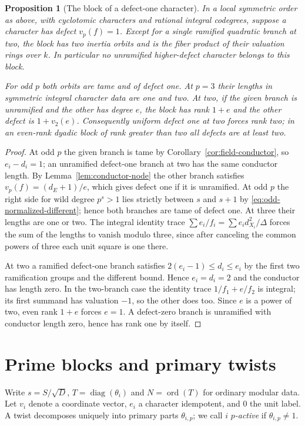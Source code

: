 \documentclass[11pt,a4paper]{article}
\numberwithin{equation}{section}
\newtheorem{proposition}[theorem]{Proposition}
\theoremstyle{remark}
\DeclareMathOperator{\ord}{ord}
\begin{document}
\begin{proposition}[The block of a defect-one character]\label{fam:M:2.10}
\label{seq:odd-defect-one}\label{lem:class}\label{prop:principal-defect-one-general}\label{lem:one-defect-block}\label{lem:two-adic-defect-one-rank}\label{lem:even-rank-defect-one}
In a local symmetric order as above, with cyclotomic characters and
rational integral codegrees, suppose a character has defect
$v_p(f)=1$. Except for a single ramified quadratic branch at two, the
block has two inertia orbits and is the fiber product of their valuation
rings over $k$. In particular no unramified higher-defect character
belongs to this block.

For odd $p$ both orbits are tame and of defect one. At $p=3$ their
lengths in symmetric integral character data are one and two.
At two, if the given branch is unramified and the other has degree
$e$, the block has rank $1+e$ and the other defect is $1+v_2(e)$.
Consequently uniform defect one at two forces rank two; in an
even-rank dyadic block of rank greater than two all defects are at
least two.
\end{proposition}
\begin{proof}
At odd $p$ the given branch is tame by
Corollary~\ref{cor:field-conductor}, so $e_i-d_i=1$; an unramified
defect-one branch at two has the same conductor length. By
Lemma~\ref{lem:conductor-node} the other branch satisfies
$v_p(f)=(d_E+1)/e$, which gives defect one if it is unramified.
At odd $p$ the right side for wild degree $p^s>1$ lies strictly
between $s$ and $s+1$ by \eqref{eq:odd-normalized-different};
hence both branches are tame of defect one. At three their lengths
are one or two. The integral identity trace
$\sum e_i/f_i=\sum e_i d_{X_i}^2/\Delta$ forces the sum of the
lengths to vanish modulo three, since after canceling the common
powers of three each unit square is one there.

At two a ramified defect-one branch satisfies $2(e_i-1)\le d_i\le e_i$
by the first two ramification groups and the different bound. Hence
$e_i=d_i=2$ and the conductor has length zero. In the two-branch
case the identity trace $1/f_1+e/f_2$ is integral; its first summand
has valuation $-1$, so the other does too. Since $e$ is a power of
two, even rank $1+e$ forces $e=1$. A defect-zero branch is
unramified with conductor length zero, hence has rank one by itself.
\end{proof}

\section{Prime blocks and primary twists}\label{fam:M:sec:3}\label{sec:blocks}
Write $s=S/\sqrt D$, $T=\operatorname{diag}(\theta_i)$ and $N=\ord(T)$ for ordinary modular data. Let $v_i$ denote a coordinate vector, $e_i$ a character idempotent, and $0$ the unit label. A twist decomposes uniquely into primary parts $\theta_{i,p}$; we call $i$ \emph{$p$-active} if $\theta_{i,p}\ne1$.
\end{document}
